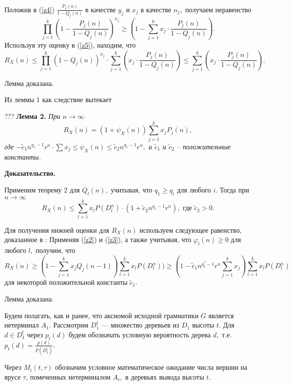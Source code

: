 \documentclass[%
11pt,a4paper]{article}
\begin{document}
{{{Положив в (\ref{z4}) $\frac {P_j(n)}{1-Q_j(n)}$ в качестве $y_j$ и $x_j$ в качестве $n_j,$ получаем неравенство 
$$
 \prod_{j=1}^k \left(1-\frac {P_j(n)}{1-Q_j(n)}\right)^{x_j} \geq \left(1-\sum_{j=1}^k x_j \cdot \frac {P_j(n)}{1-Q_j(n)}\right).
$$
Используя эту оценку в (\ref{z5}), находим, что
$$
R_X(n)\le
\prod_{j=1}^k \left(1-Q_j(n) \right)^{x_j}\cdot
\sum_{j=1}^k \left(x_j \cdot \frac{P_j(n)}{1-Q_j(n)}\right)\le 
\sum_{j=1}^k \left(x_j \cdot \frac{P_j(n)}{1-Q_j(n)}\right).
$$

\medskip
Лемма доказана.

Из леммы 1 как следствие вытекает 

\medskip

???
\textbf {Лемма 2.}
{\em
При $n \rightarrow \infty$
$$
R_X(n)=
\left(1+\psi_X(n)\right)
\sum_{j=1}^k x_j P_j(n),
$$
где $-\tilde{c}_1 n^{q_1-1}r^n \cdot \sum x_j \le \psi_X(n)\le \tilde{c}_2n^{q_1-1 }r^n ,$ и
$\tilde{c}_1$ и $\tilde{c}_2$ -- положительные константы.%
}

\medskip

{\bf Доказательство.}

Применим теорему 2 для $Q_l(n),$ учитывая, что $q_1 \ge q_i$ для любого $i.$
Тогда при $n \rightarrow \infty$
$$
R_X(n)\le \sum_{l=1}^k x_l P(D_l^{n})\cdot
(1+\tilde{c}_2 n^{q_1-1 } r^n )
, \,\, \mbox{где}\, \, \tilde{c}_2>0.
$$

Для получения нижней оценки для $R_X(n)$ используем следующее равенство, доказанное в \cite{sev}:
Применяя (\ref{z2}) и (\ref{z3}), а также учитывая, что $\varphi_l(n)\geq 0$ для любого $l,$ получим, что
$$
R_X(n)\ge
\left(1-\sum_{j=1}^k x_j Q_j(n-1) \right)\sum_{l=1}^k x_l P(D_l^{n}))\geq
\left(1-\tilde{c}_1 n^{q^{*}_1-1} r^{n}\sum_{j=1}^k x_j\right) \sum_{l=1}^k x_l P(D_l^{n})
$$
для некоторой положительной константы $\tilde{c}_1.$

Лемма доказана.

\nopagebreak
\medskip

Будем полагать, как и ранее, что аксиомой исходной грамматики $G$
является нетерминал $A_1.$
Рассмотрим $D^t_1$ --- множество деревьев из $D_1$ высоты $t.$
Для $d \in D_1^t$ через $p_t(d)$ будем обозначать условную вероятность дерева $d,$ т.е. $p_t(d)=\frac{p(d)}{P(D_1^t)}.$

\medskip

Через $M_i(t,\tau)$ обозначим условное математическое ожидание числа вершин
на ярусе $\tau$, помеченных нетерминалом $A_i,$ в деревьях вывода высоты $t.$

}}}
\end{document}
